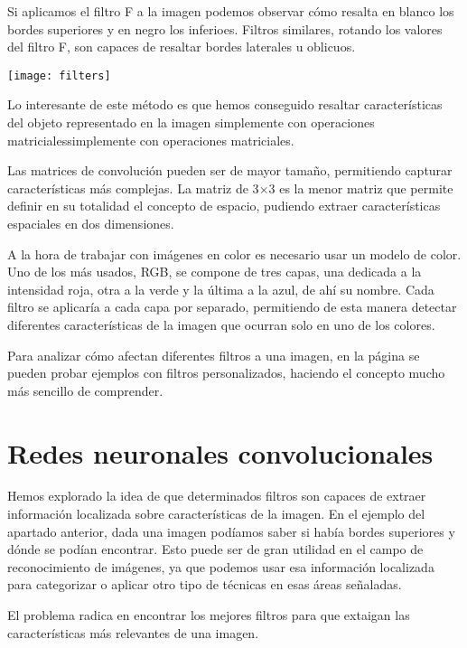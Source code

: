 Si aplicamos el filtro F a la imagen podemos observar cómo resalta en blanco los bordes superiores y en negro los inferioes. Filtros similares, rotando los valores del filtro F, son capaces de resaltar bordes laterales u oblicuos.

\begin{center}
  \texttt{[image: filters]}
\end{center}

Lo interesante de este método es que hemos conseguido resaltar características del objeto representado en la imagen simplemente con operaciones matricialessimplemente con operaciones matriciales.

Las matrices de convolución pueden ser de mayor tamaño, permitiendo capturar características más complejas. La matriz de 3$\times$3 es la menor matriz que permite definir en su totalidad el concepto de espacio, pudiendo extraer características espaciales en dos dimensiones.

A la hora de trabajar con imágenes en color es necesario usar un modelo de color. Uno de los más usados, RGB, se compone de tres capas, una dedicada a la intensidad roja, otra a la verde y la última a la azul, de ahí su nombre. Cada filtro se aplicaría a cada capa por separado, permitiendo de esta manera detectar diferentes características de la imagen que ocurran solo en uno de los colores.

Para analizar cómo afectan diferentes filtros a una imagen, en la página \parencite{visualizer_convolution} se pueden probar ejemplos con filtros personalizados, haciendo el concepto mucho más sencillo de comprender.

\section{Redes neuronales convolucionales}
\label{sec:conv-net}

Hemos explorado la idea de que determinados filtros son capaces de extraer información localizada sobre características de la imagen. En el ejemplo del apartado anterior, dada una imagen podíamos saber si había bordes superiores y dónde se podían encontrar. Esto puede ser de gran utilidad en el campo de reconocimiento de imágenes, ya que podemos usar esa información localizada para categorizar o aplicar otro tipo de técnicas en esas áreas señaladas.

El problema radica en encontrar los mejores filtros para que extaigan las características más relevantes de una imagen.

